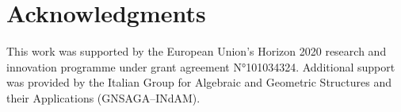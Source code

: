 \documentclass[
    crop=false,
    a4paper,
    10pt,
]{article}
\begin{document}
\section*{Acknowledgments}  
This work was supported by the European Union’s Horizon 2020 research and innovation programme under grant agreement N°101034324. Additional support was provided by the Italian Group for Algebraic and Geometric Structures and their Applications (GNSAGA–INdAM).  

\bigskip
\printbibliography



\end{document}
